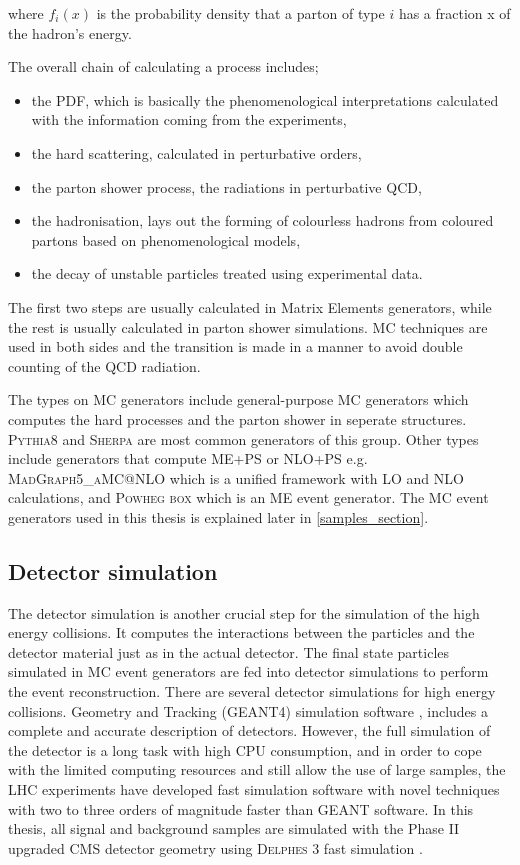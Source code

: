 where $f_i(x)$ is the probability density that a parton of type $i$ has a fraction x of the hadron's energy.

The overall chain of calculating a process includes;
\begin{itemize}
    \item the PDF, which is basically the phenomenological interpretations calculated with the information coming from the experiments,
    \item the hard scattering, calculated in perturbative orders,
    \item the parton shower process, the radiations in perturbative QCD,
    \item the hadronisation, lays out the forming of colourless hadrons from coloured partons based on phenomenological models,
    \item the decay of unstable particles treated using experimental data.
\end{itemize}
The first two steps are usually calculated in Matrix Elements generators, while the rest is usually calculated in parton shower simulations. MC techniques are used in both sides and the transition is made in a manner to avoid double counting of the QCD radiation.

The types on MC generators include general-purpose MC generators which computes the hard processes and the parton shower in seperate structures. \textsc{Pythia8} and \textsc{Sherpa} are most common generators of this group. Other types include generators that compute ME+PS or NLO+PS e.g. \textsc{MadGraph5\_aMC@NLO} which is a unified framework with LO and NLO calculations, and \textsc{Powheg box} which is an ME event generator. The MC event generators used in this thesis is explained later in \autoref{samples_section}.

\subsection{Detector simulation}\label{detector_sim_subsection}

The detector simulation is another crucial step for the simulation of the high energy collisions. It computes the interactions between the particles and the detector material just as in the actual detector. The final state particles simulated in MC event generators are fed into detector simulations to perform the event reconstruction. There are several detector simulations for high energy collisions. Geometry and Tracking (GEANT4) simulation software \cite{Agostinelli2003}, includes a complete and accurate description of detectors. However, the full simulation of the detector is a long task with high CPU consumption, and in order to cope with the limited computing resources and still allow the use of large samples, the LHC experiments have developed fast simulation software with novel techniques \cite{Sekmen:2242542, Lukas:2012kua} with two to three orders of magnitude faster than GEANT software. In this thesis, all signal and background samples are simulated with the Phase II upgraded CMS detector geometry using \textsc{Delphes} 3 fast simulation \cite{Selvaggi:2014mya}.

